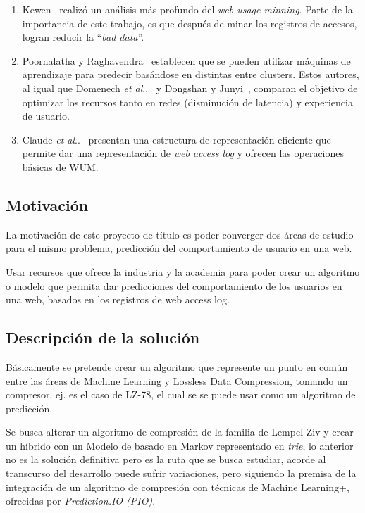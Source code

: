 \documentclass{udparticle}
\makeatletter
\DeclareRobustCommand\onedot{\futurelet\@let@token\@onedot}
\newcommand\@onedot{\ifx\@let@token.\else.\null\fi\xspace}
\newcommand\etal{\emph{et al}\onedot}
\makeatother
\begin{document}
\begin{enumerate}
  \item Kewen~\cite{kewen2012} realizó un análisis más profundo del \emph{web usage minning}.
  Parte de la importancia de este trabajo, es que después de minar los registros de accesos, logran reducir la ``\emph{bad data}''.

  \item Poornalatha y Raghavendra~\cite{Poornalatha2012} establecen que se pueden utilizar máquinas de aprendizaje para predecir basándose en distintas entre clusters. Estos autores, al igual que Domenech \etal~\cite{Domenech2006} y Dongshan y Junyi~\cite{Dongshan2002}, comparan el objetivo de optimizar los recursos tanto en redes (disminución de latencia) y experiencia de usuario.

  \item Claude \etal~\cite{Claude2014} presentan una estructura de representación eficiente que permite dar una representación de \emph{web access log} y ofrecen las operaciones básicas de WUM.
\end{enumerate}


\subsection{Motivación}

La motivación de este proyecto de título es poder converger dos áreas de estudio para el mismo problema, predicción del comportamiento de usuario en una web.

Usar recursos que ofrece la industria y la academia para poder crear un algoritmo o modelo que permita dar predicciones del comportamiento de los usuarios en una web, basados en los registros de web access log.


\subsection{Descripción de la solución }
Básicamente se pretende crear un algoritmo que represente un punto en común entre las áreas de Machine Learning y Lossless Data Compression, tomando un compresor, ej. es el caso de LZ-78, el cual se se puede usar como un algoritmo de predicción.

Se busca alterar un algoritmo de compresión de la familia de Lempel Ziv y crear un híbrido con un Modelo de basado en Markov representado en \emph{trie}, lo anterior no es la solución definitiva pero es la ruta que se busca estudiar, acorde al transcurso del desarrollo puede sufrir variaciones, pero siguiendo la premisa de la integración de un algoritmo de compresión con técnicas de Machine Learning+, ofrecidas por \textit{Prediction.IO (PIO)}.
\end{document}
